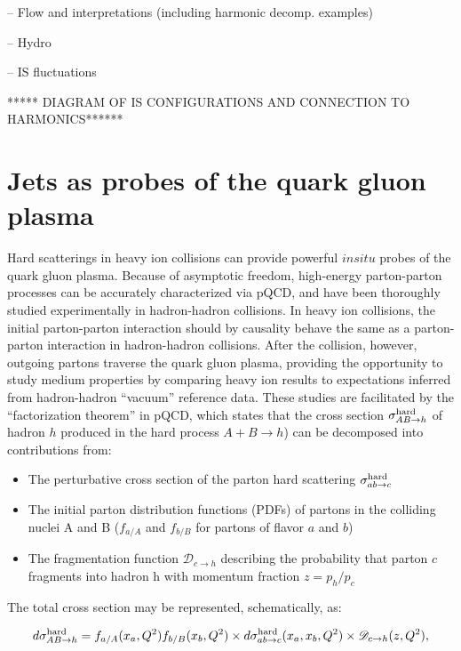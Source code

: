 -- Flow and interpretations (including harmonic decomp. examples)

-- Hydro

-- IS fluctuations

***** DIAGRAM OF IS CONFIGURATIONS AND CONNECTION TO HARMONICS******

\clearpage

\section{Jets as probes of the quark gluon plasma}
\label{sec:theory_jets}

Hard scatterings in heavy ion collisions can provide powerful $in situ$ probes of the quark gluon plasma.  Because of asymptotic freedom, high-energy parton-parton processes can be accurately characterized via pQCD, and have been thoroughly studied experimentally in hadron-hadron collisions.  In heavy ion collisions, the initial parton-parton interaction should by 
causality behave the same as a parton-parton interaction in hadron-hadron collisions.  After the collision, however, outgoing partons traverse the quark gluon plasma, providing the opportunity to study medium properties by comparing heavy ion results to expectations inferred from hadron-hadron ``vacuum'' reference data.  These studies are facilitated by the ``factorization theorem'' in pQCD, which states that the cross section $\sigma_{AB\rightarrow h}^{\rm hard}$ of hadron $h$  produced in the hard process $ A + B \rightarrow h$) can be decomposed into contributions from:  

\begin{itemize}
\item The perturbative cross section of the parton hard scattering $\sigma_{ab\rightarrow c}^{\rm hard}$ 
\item The initial parton distribution functions (PDFs) of partons in the colliding nuclei A and B ($f_{a/A}$ and $f_{b/B}$ for partons of flavor $a$ and $b$)
\item The fragmentation function $\mathscr{D}_{c\rightarrow h}$ describing the probability that parton $c$ fragments into hadron h with momentum fraction $z = p_{h}/p_{c}$ 
\end{itemize}

\noindent The total cross section may be represented, schematically, as:  

\begin{equation}
\label{eq:factorization}
d \sigma_{AB\rightarrow h}^{\rm hard} = f_{a/A}(x_{a},Q^{2})  f_{b/B}(x_{b},Q^{2}) \times d \sigma_{ab\rightarrow c}^{\rm hard}(x_{a},x_{b},Q^{2}) \times \mathscr{D}_{c\rightarrow h}(z,Q^{2}),
\end{equation}

